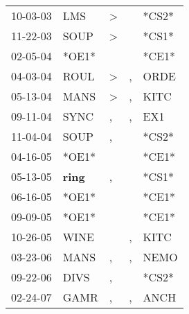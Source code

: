 \begin{supertabular}{p{0.07\textwidth}p{0.06\textwidth}p{0.02\textwidth}p{0.02\textwidth}p{0.06\textwidth}}
 10-03-03\textsuperscript{} &            LMS\textsuperscript{} &     \textgreater &               &                            *CS2* \\
 11-22-03\textsuperscript{} &           SOUP\textsuperscript{} &     \textgreater &               &                            *CS1* \\
 02-05-04\textsuperscript{} &                            *OE1* &                  &               &                            *CE1* \\
 04-03-04\textsuperscript{} &           ROUL\textsuperscript{} &     \textgreater &             , &           ORDE\textsuperscript{} \\
 05-13-04\textsuperscript{} &           MANS\textsuperscript{} &     \textgreater &             , &           KITC\textsuperscript{} \\
 09-11-04\textsuperscript{} &           SYNC\textsuperscript{} &                , &             , &            EX1\textsuperscript{} \\
 11-04-04\textsuperscript{} &           SOUP\textsuperscript{} &                , &               &                            *CS2* \\
 04-16-05\textsuperscript{} &                            *OE1* &                  &               &                            *CE1* \\
 05-13-05\textsuperscript{} &  \textbf{ring\textsuperscript{}} &                , &               &                            *CS1* \\
 06-16-05\textsuperscript{} &                            *OE1* &                  &               &                            *CE1* \\
 09-09-05\textsuperscript{} &                            *OE1* &                  &               &                            *CE1* \\
 10-26-05\textsuperscript{} &           WINE\textsuperscript{} &                  &             , &           KITC\textsuperscript{} \\
 03-23-06\textsuperscript{} &           MANS\textsuperscript{} &                , &             , &           NEMO\textsuperscript{} \\
 09-22-06\textsuperscript{} &           DIVS\textsuperscript{} &                , &               &                            *CS2* \\
 02-24-07\textsuperscript{} &           GAMR\textsuperscript{} &                , &             , &           ANCH\textsuperscript{} \\

\end{supertabular}
